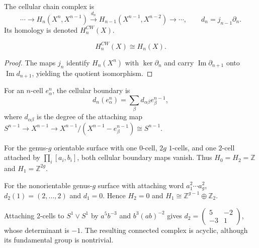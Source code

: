 The cellular chain complex is
\[
\cdots\to H_n(X^n,X^{n-1})\xrightarrow{d_n}H_{n-1}(X^{n-1},X^{n-2})\to\cdots,
\qquad d_n=j_{n-1}\partial_n.
\]
Its homology is denoted $H_n^{CW}(X)$.

\begin{theorem}
\label{thm:cellular-singular-homology-isomorphic}
\[
H_n^{CW}(X)\cong H_n(X).
\]
\end{theorem}
\begin{proof}
\sketch The maps $j_n$ identify $H_n(X^n)$ with $\ker\partial_n$ and carry $\operatorname{Im}\partial_{n+1}$ onto $\operatorname{Im}d_{n+1}$, yielding the quotient isomorphism.
\end{proof}

For an $n$-cell $e_\alpha^n$, the cellular boundary is
\[
d_n(e_\alpha^n)=\sum_\beta d_{\alpha\beta}e_\beta^{n-1},
\]
where $d_{\alpha\beta}$ is the degree of the attaching map $S^{n-1}\to X^{n-1}\to X^{n-1}/(X^{n-1}-e_\beta^{n-1})\cong S^{n-1}$.

\begin{example}
\label{ex:cellular-homology-spheres}
For the genus-$g$ orientable surface with one $0$-cell, $2g$ $1$-cells, and one $2$-cell attached by $\prod_i[a_i,b_i]$, both cellular boundary maps vanish.  Thus $H_0=H_2=\mathbb{Z}$ and $H_1=\mathbb{Z}^{2g}$.
\end{example}

\begin{example}
\label{ex:cellular-homology-surfaces}
For the nonorientable genus-$g$ surface with attaching word $a_1^2\cdots a_g^2$, $d_2(1)=(2,\ldots,2)$ and $d_1=0$.  Hence $H_2=0$ and $H_1\cong\mathbb{Z}^{g-1}\oplus\mathbb{Z}_2$.
\end{example}

\begin{example}
\label{ex:acyclic-space}
Attaching 2-cells to $S^1\vee S^1$ by $a^5b^{-3}$ and $b^3(ab)^{-2}$ gives $d_2=\begin{pmatrix}5&-2\\-3&1\end{pmatrix}$, whose determinant is $-1$.  The resulting connected complex is acyclic, although its fundamental group is nontrivial.
\end{example}

